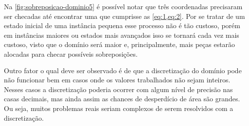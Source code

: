 Na \autoref{fig:sobreposicao-dominio5} é possível notar que três coordenadas precisaram ser checadas
até encontrar uma que cumprisse as \autoref{eq:1,eq:2}.
Por se tratar de um estado inicial de uma instância pequena esse processo não é tão custoso,
porém em instâncias maiores ou estados mais avançados isso se tornará cada vez mais custoso,
visto que o domínio será maior e, principalmente, mais peças estarão alocadas para checar
possíveis sobreposições.



Outro fator o qual deve ser observado é de que a discretização do domínio pode não funcionar bem em
casos onde os valores trabalhados não sejam inteiros.
Nesses casos a discretização poderia ocorrer com algum nível de precisão nas casas decimais,
mas ainda assim as chances de desperdício de área são grandes.
Ou seja, muitos problemas reais seriam complexos de serem resolvidos com a discretização.
